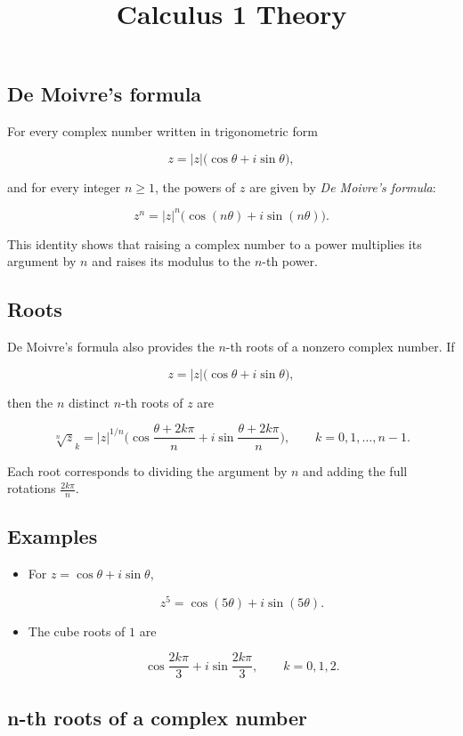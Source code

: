 \documentclass[11pt,a4paper]{article} \usepackage[T1]{fontenc}
\theoremstyle{plain} \newtheorem{theorem}{Theorem} \title{Calculus 1 Theory}
\begin{document}
\subsection*{De Moivre's formula}

For every complex number written in trigonometric form

\[
z = |z|\bigl(\cos\theta + i\sin\theta\bigr),
\]

and for every integer $n\ge 1$, the powers of $z$ are given by \emph{De
Moivre's formula}:

\[
z^n = |z|^n\bigl(\cos(n\theta) + i\sin(n\theta)\bigr).
\]

This identity shows that raising a complex number to a power multiplies its
argument by $n$ and raises its modulus to the $n$-th power.

\subsection*{Roots}

De Moivre's formula also provides the $n$-th roots of a nonzero complex number.
If

\[
z = |z|\bigl(\cos\theta + i\sin\theta\bigr),
\]

then the $n$ distinct $n$-th roots of $z$ are

\[
\sqrt[n]{z}_k = |z|^{1/n}\bigl(\cos\frac{\theta + 2k\pi}{n}
+ i\sin\frac{\theta + 2k\pi}{n}\bigr), \qquad k=0,1,\ldots,n-1.
\]

Each root corresponds to dividing the argument by $n$ and adding the full
rotations $\frac{2k\pi}{n}$.

\subsection*{Examples}

\begin{itemize}
\item For $z = \cos\theta + i\sin\theta$,

\[
z^5 = \cos(5\theta) + i\sin(5\theta).
\]

\item The cube roots of $1$ are

\[
\cos\frac{2k\pi}{3} + i\sin\frac{2k\pi}{3},
\qquad k=0,1,2.
\]

\end{itemize}

\subsection*{n-th roots of a complex number}
\end{document}
